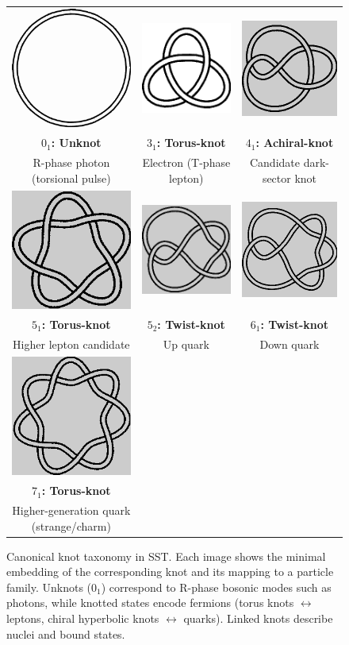 \documentclass[reprint,aps,onecolumn,nofootinbib]{revtex4-2}
\begin{document}
        \begin{figure}[htbp]
        \centering
        \setlength{\tabcolsep}{8pt}
        \renewcommand{\arraystretch}{1.2}
        \begin{tabular}{ccc}
        \includegraphics[width=0.04\linewidth]{figures/0_1} &
        \includegraphics[width=0.04\linewidth]{figures/a3_1} &
        \includegraphics[width=0.04\linewidth]{figures/4_1} \\
        \textbf{$0_1$: Unknot} &
        \textbf{$3_1$: Torus-knot} &
        \textbf{$4_1$: Achiral-knot} \\
        \small R-phase photon (torsional pulse) &
        \small Electron (T-phase lepton) &
        \small Candidate dark-sector knot \\[4pt]
        \includegraphics[width=0.04\linewidth]{figures/5_1} &
        \includegraphics[width=0.04\linewidth]{figures/5_2} &
        \includegraphics[width=0.04\linewidth]{figures/6_1} \\
        \textbf{$5_1$: Torus-knot}&
        \textbf{$5_2$: Twist-knot}&
        \textbf{$6_1$: Twist-knot}\\
        \small Higher lepton candidate &
        \small Up quark &
        \small Down quark \\[4pt]
        \includegraphics[width=0.04\linewidth]{figures/7_1} & & \\
        \textbf{$7_1$: Torus-knot}  & & \\
        \small Higher-generation quark (strange/charm) & &
        \end{tabular}
        \caption{Canonical knot taxonomy in SST. Each image shows the minimal embedding of the corresponding knot and its mapping to a particle family. Unknots (0$_1$) correspond to R-phase bosonic modes such as photons, while knotted states encode fermions (torus knots $\leftrightarrow$ leptons, chiral hyperbolic knots $\leftrightarrow$ quarks). Linked knots describe nuclei and bound states.}
        \label{fig:knot-taxonomy}
        \end{figure}
\end{document}
